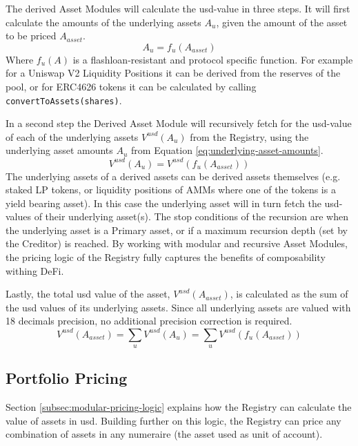 \documentclass[sigconf,nonacm]{acmart}
\begin{document}
The derived Asset Modules will calculate the usd-value in three steps.
It will first calculate the amounts of the underlying assets $A_{u}$, given the amount of the asset to be priced $A_{asset}$.
\begin{equation}
    \label{eq:underlying-asset-amounts}
    A_{u} = f_{u}(A_{asset})
\end{equation}
Where $f_{u}(A)$ is a flashloan-resistant and protocol specific function.
For example for a Uniswap V2 Liquidity Positions it can be derived from the reserves of the pool,
or for ERC4626 tokens it can be calculated by calling \texttt{convertToAssets(shares)}.

In a second step the Derived Asset Module will recursively fetch for the usd-value of each of the underlying assets $V^{usd}(A_{u})$ from the Registry,
using the underlying asset amounts $A_{u}$ from Equation \ref{eq:underlying-asset-amounts}.
\begin{equation}
    V^{usd}(A_{u}) = V^{usd}(f_{u}(A_{asset}))
\end{equation}
The underlying assets of a derived assets can be derived assets themselves (e.g. staked LP tokens, or liquidity positions of AMMs where one of the tokens is a yield bearing asset).
In this case the underlying asset will in turn fetch the usd-values of their underlying asset(s).
The stop conditions of the recursion are when the underlying asset is a Primary asset, or if a maximum recursion depth (set by the Creditor) is reached.
By working with modular and recursive Asset Modules, the pricing logic of the Registry fully captures the benefits of composability withing DeFi.

Lastly, the total usd value of the asset, $V^{usd}(A_{asset})$, is calculated as the sum of the usd values of its underlying assets.
Since all underlying assets are valued with 18 decimals precision, no additional precision correction is required.
\begin{equation}
    V^{usd}(A_{asset}) = \sum_{u}{V^{usd}(A_{u})} = \sum_{u}{V^{usd}(f_{u}(A_{asset}))}
\end{equation}

\subsection{Portfolio Pricing}
\label{subsec:portfolio-pricing}
Section \ref{subsec:modular-pricing-logic} explains how the Registry can calculate the value of assets in usd.
Building further on this logic, the Registry can price any combination of assets in any numeraire (the asset used as unit of account).
\end{document}

